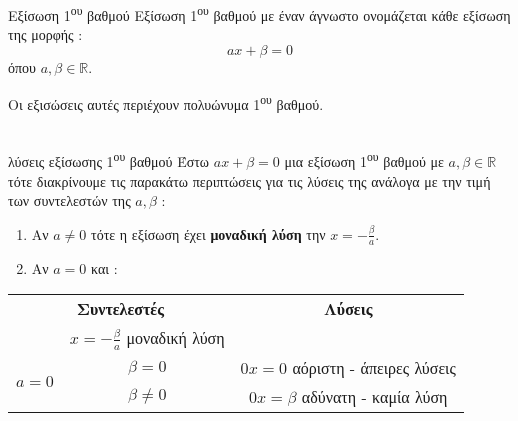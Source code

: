 \begin{orismos}{Εξίσωση 1\textsuperscript{\MakeLowercase{ου}} βαθμού}
Εξίσωση 1\textsuperscript{ου} βαθμού με έναν άγνωστο ονομάζεται κάθε εξίσωση της μορφής :
\[ ax+\beta=0 \]
όπου $ a,\beta\in\mathbb{R} $.
\end{orismos}
Oι εξισώσεις αυτές περιέχουν πολυώνυμα 1\textsuperscript{ου} βαθμού.\\\\
\begin{thewrhma}{
λύσεις εξίσωσης 1\textsuperscript{\MakeLowercase{ου}} βαθμού}
Έστω $ ax+\beta=0 $ μια εξίσωση 1\textsuperscript{ου} βαθμού με $ a,\beta\in\mathbb{R} $ τότε διακρίνουμε τις παρακάτω περιπτώσεις για τις λύσεις της ανάλογα με την τιμή των συντελεστών της $ a,\beta $ :
\begin{enumerate}
\item Αν $ a\neq0 $ τότε η εξίσωση έχει \textbf{μοναδική λύση} την $ x=-\frac{\beta}{a} $.
\item Αν $ a=0 $ και :
\end{enumerate}
\end{thewrhma}
\begin{center}
\begin{tabular}{c|c|c}
\hline\multicolumn{2}{c}{\textbf{Συντελεστές}} & \textbf{Λύσεις} \rule[-2ex]{0pt}{5.5ex}\\ 
\hhline{===}  \multicolumn{2}{c}{$a\neq0$} &  $ x=-\frac{\beta}{a} $ μοναδική λύση \rule[-2ex]{0pt}{5.5ex}\\ 
\hline \multirow{3}{*}{$a=0$}  & $ \beta=0 $ & $ 0x=0 $ αόριστη - άπειρες λύσεις \rule[-2ex]{0pt}{5.5ex}\\
\hhline{~--} \rule[-2ex]{0pt}{5.5ex}   & $ \beta\neq0 $ & $ 0x=\beta $ αδύνατη - καμία λύση \\ 
\hline 
\end{tabular}
\end{center}\mbox{}\\
\Lymena
